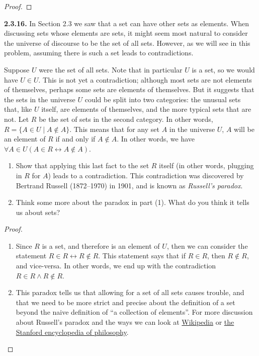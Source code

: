 \documentclass[12pt]{amsart}
\newenvironment{statement}[1]{\smallskip\noindent\color[rgb]{.6627, .3529, .6314} {\bf #1.}}{}
\theoremstyle{definition}
\theoremstyle{remark}
\begin{document}
\begin{proof}
\end{proof}


\begin{statement}{2.3.16}
In Section 2.3 we saw that a set can have other sets as elements.
When discussing sets whose elements are sets, it might seem most natural to consider the universe of discourse to be the set of all sets.
However, as we will see in this problem, assuming there is such a set leads to contradictions.

Suppose $U$ were the set of all sets.
Note that in particular $U$ is a set, so we would have $U \in U$.
This is not yet a contradiction;
although most sets are not elements of themselves, perhaps some sets are elements of themselves.
But it suggests that the sets in the universe $U$ could be split into two categories:
the unusual sets that, like $U$ itself, are elements of themselves,
and the more typical sets that are not.
Let $R$ be the set of sets in the second category.
In other words, $R = \{ A \in U \mid A \notin A \}$.
This means that for any set $A$ in the universe $U$,
$A$ will be an element of $R$ if and only if $A \notin A$.
In other words, we have $\forall A \in U (A \in R \leftrightarrow A \notin A)$.
\begin{enumerate}
	\item Show that applying this last fact to the set $R$ itself
	(in other words, plugging in $R$ for $A$) leads to a contradiction.
	This contradiction was discovered by Bertrand Russell (1872--1970) in 1901,
	and is known as \emph{Russell's paradox}.
	
	\item Think some more about the paradox in part (1).
	What do you think it tells us about sets?
\end{enumerate}
\end{statement}

\begin{proof}
\hfill
\begin{enumerate}
	\item Since $R$ is a set, and therefore is an element of $U$, then we can consider the statement
	$R \in R \leftrightarrow R \notin R$.
	This statement says that if $R \in R$, then $R \notin R$, and vice-versa.
	In other words, we end up with the contradiction $R \in R \wedge R \notin R$.
	
	\item This paradox tells us that allowing for a set of all sets causes trouble,
	and that we need to be more strict and precise about the definition of a set
	beyond the naive definition of ``a collection of elements''.
	For more discussion about Russell's paradox and the ways we can look at
	\href{https://en.wikipedia.org/wiki/Russell\%27s_paradox}{Wikipedia}
	or \href{https://plato.stanford.edu/entries/russell-paradox/}
	{the Stanford encyclopedia of philosophy}.
\end{enumerate}
\end{proof}
\end{document}
